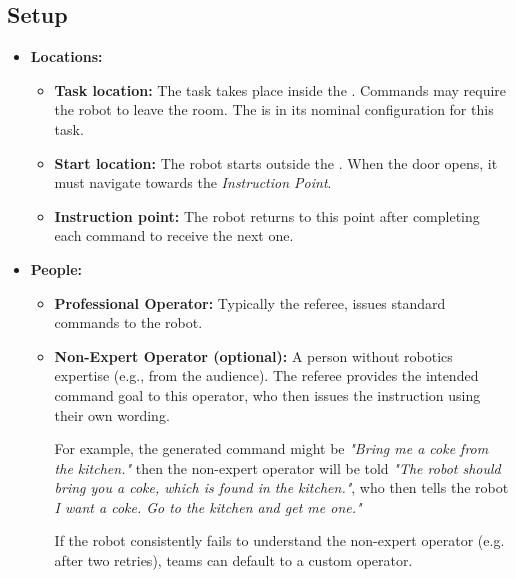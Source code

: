 \subsection*{Setup}
\begin{itemize}[nosep]
    \item \textbf{Locations:}
        \begin{itemize}
            \item \textbf{Task location:} The task takes place inside the \Arena{}. Commands may require the robot to leave the room. The \Arena{} is in its nominal configuration for this task.
            \item \textbf{Start location:} The robot starts outside the \Arena{}. When the door opens, it must navigate towards the \textit{Instruction Point}.
            \item \textbf{Instruction point:} The robot returns to this point after completing each command to receive the next one.
        \end{itemize}
    \item \textbf{People:}
        \begin{itemize}
			\item \textbf{Professional Operator:} Typically the referee, issues standard commands to the robot.
			\item \textbf{Non-Expert Operator (optional):} A person without robotics expertise (e.g., from the audience). The referee provides the intended command goal to this operator, who then issues the instruction using their own wording.

            For example, the generated command might be \textit{"Bring me a coke from the kitchen."} then the non-expert operator will be told \textit{"The robot should bring you a coke, which is found in the kitchen."}, who then tells the robot \textit{I want a coke. Go to the kitchen and get me one."}

            If the robot consistently fails to understand the non-expert operator (e.g. after two retries), teams can default to a custom operator.
        \end{itemize}
\end{itemize}


